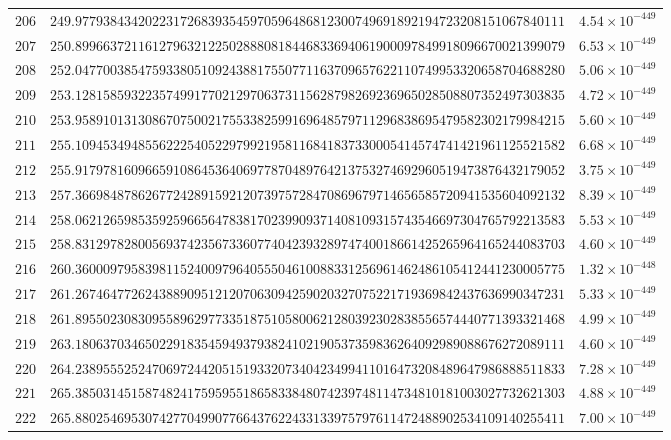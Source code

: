 \documentclass[12pt,reqno]{amsart}
\theoremstyle{remark}
\begin{document}
\begin{longtable}{clc}
$206$ & $249.9779384342022317268393545970596486812300749691892194723208151067840111$ & $4.54\times 10^{-449}$ \\
$207$ & $250.8996637211612796321225028880818446833694061900097849918096670021399079$ & $6.53\times 10^{-449}$ \\
$208$ & $252.0477003854759338051092438817550771163709657622110749953320658704688280$ & $5.06\times 10^{-449}$ \\
$209$ & $253.1281585932235749917702129706373115628798269236965028508807352497303835$ & $4.72\times 10^{-449}$ \\
$210$ & $253.9589101313086707500217553382599169648579711296838695479582302179984215$ & $5.60\times 10^{-449}$ \\
$211$ & $255.1094534948556222540522979921958116841837330005414574741421961125521582$ & $6.68\times 10^{-449}$ \\
$212$ & $255.9179781609665910864536406977870489764213753274692960519473876432179052$ & $3.75\times 10^{-449}$ \\
$213$ & $257.3669848786267724289159212073975728470869679714656585720941535604092132$ & $8.39\times 10^{-449}$ \\
$214$ & $258.0621265985359259665647838170239909371408109315743546697304765792213583$ & $5.53\times 10^{-449}$ \\
$215$ & $258.8312978280056937423567336077404239328974740018661425265964165244083703$ & $4.60\times 10^{-449}$ \\
$216$ & $260.3600097958398115240097964055504610088331256961462486105412441230005775$ & $1.32\times 10^{-448}$ \\
$217$ & $261.2674647726243889095121207063094259020327075221719369842437636990347231$ & $5.33\times 10^{-449}$ \\
$218$ & $261.8955023083095589629773351875105800621280392302838556574440771393321468$ & $4.99\times 10^{-449}$ \\
$219$ & $263.1806370346502291835459493793824102190537359836264092989088676272089111$ & $4.60\times 10^{-449}$ \\
$220$ & $264.2389555252470697244205151933207340423499411016473208489647986888511833$ & $7.28\times 10^{-449}$ \\
$221$ & $265.3850314515874824175959551865833848074239748114734810181003027732621303$ & $4.88\times 10^{-449}$ \\
$222$ & $265.8802546953074277049907766437622433133975797611472488902534109140255411$ & $7.00\times 10^{-449}$ \\

\end{longtable}
\end{document}
